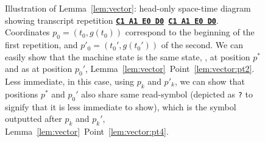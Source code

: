 \begin{figure}[h!]
\begin{minipage}[t]{1\textwidth}
{
        }
    \end{minipage}
    \caption{Illustration of Lemma~\ref{lem:vector}: head-only space-time diagram showing transcript repetition \texttt{\textbf{\underline{C1 A1 E0 D0}} \textbf{\underline{C1 A1 E0 D0}}}. Coordinates $p_0 = (t_0,g(t_0))$ correspond to the beginning of the first repetition, and $p'_0 = (t_0',g(t_0'))$ of the second. We can easily show that the machine state is the same state, \stateC, at position $p^*$ and as at position $p_0'$, Lemma~\ref{lem:vector}~Point~\ref{lem:vector:pt2}. Less immediate, in this case, using $p_k$ and $p'_k$, we can show that positions $p^*$ and $p_0'$ also share same read-symbol (depicted as \texttt{?} to signify that it is less immediate to show), which is the symbol outputted after $p_k$ and $p_k'$, Lemma~\ref{lem:vector}~Point~\ref{lem:vector:pt4}. }\label{fig:loop-lemma}
\end{figure}


